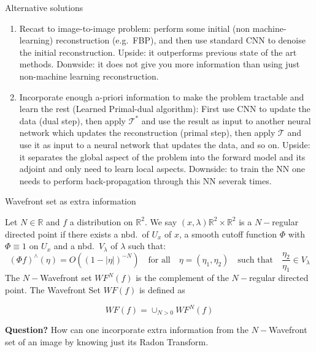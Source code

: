 \begin{frame}{Alternative solutions}
\begin{enumerate}
\item Recast to image-to-image problem: perform some initial (non machine-learning) reconstruction (e.g.\ FBP), and then use standard CNN to denoise the initial reconstruction. Upside: it outperforms previous state of the art methods. Donwside: it does not give you more information than using just non-machine learning reconstruction.

\pause 

\item Incorporate enough a-priori information to make the problem tractable and learn the rest (Learned Primal-dual algorithm): First use CNN to update the data (dual step), then apply $\mathcal{T}^*$ and use the result as input to another neural network which updates the reconstruction (primal step), then apply $\mathcal{T}$ and use it as input to a neural network that updates the data, and so on. Upside: it separates the global aspect of the problem into the forward model and its adjoint and only need to learn local aspects. Downside: to train the NN one needs to perform back-propagation through this NN severak times. 
\end{enumerate}
\end{frame}

\begin{frame}{Wavefront set as extra information}
\begin{definition}
Let $N\in\mathbb{R}$ and $f$ a distribution on $\mathbb{R}^2$. We say $(x,\lambda)\mathbb{R}^2\times \mathbb{R}^2$ is a $N-$regular directed point if there exists a nbd.\ of $U_x$ of $x$, a smooth cutoff function $\Phi$ with $\Phi\equiv 1$ on $U_x$ and a nbd.\ $V_{\lambda}$ of $\lambda$ such that:
$$
(\Phi f)^{\wedge}(\eta)=O((1-|\eta|)^{-N}) \quad \text{for all}\quad \eta=(\eta_1,\eta_2) \quad \text{such that}\quad \frac{\eta_2}{\eta_1}\in V_{\lambda}
$$
The $N-$Wavefront set $WF^N(f)$ is the complement of the $N-$regular directed point. The Wavefront Set $WF(f)$ is defined as 

\begin{equation}
\label{eq:Wavefront-set}
WF(f)=\cup_{N>0}WF^N(f)
\end{equation}
\end{definition}
\textbf{Question?} How can one incorporate extra information from the $N-$Wavefront set of an image by knowing just its Radon Transform.
\end{frame}

